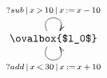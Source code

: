 $\xymatrix{
   \ovalbox{$l_0$} \ar@(ul,ur)[]^{?sub\,|\,x\,>\,10\,|\,x\,:=\,x\,-\,10} \ar@(dl,dr)[]_{?add\,|\,x\,<\,30\,|\,x\,:=\,x\,+\,10}
}$

